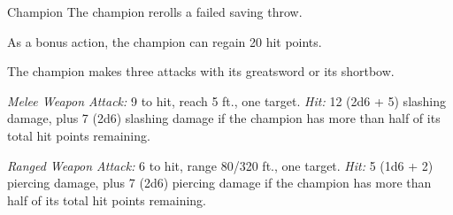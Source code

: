 \documentclass[10pt,a4paper,twoside,bg=print,twocolumn,openany,nodeprecatedcode]{dndbook}
\begin{document}
\begin{DndMonster}[float=t]{Champion}
\DndMonsterBasics[
armor-class = {18 (\textit{plate armor})},
hit-points = {\DndDice{22d8 + 44}},
speed = {30 ft.}
]
\DndMonsterAbilityScores[
 str = 20,
 dex = 15,
 con = 14,
 int = 10,
 wis = 14,
 cha = 12
]
\DndMonsterDetails[
saving-throws = {Str +9, Con +6},
skills = {Athletics +9, Intimidation +5, Perception +6},
languages = {any one language (usually Common)},
challenge = 9,
]
The champion rerolls a failed saving throw.

As a bonus action, the champion can regain 20 hit points.

The champion makes three attacks with its greatsword or its shortbow.

\textsl{Melee Weapon Attack:} 9 to hit, reach 5 ft., one target. \textsl{Hit:} 12 (2d6 + 5) slashing damage, plus 7 (2d6) slashing damage if the champion has more than half of its total hit points remaining.

\textsl{Ranged Weapon Attack:} 6 to hit, range 80/320 ft., one target. \textsl{Hit:} 5 (1d6 + 2) piercing damage, plus 7 (2d6) piercing damage if the champion has more than half of its total hit points remaining.

\end{DndMonster}
\end{document}
